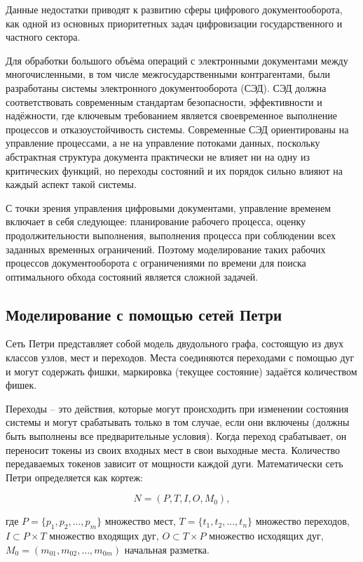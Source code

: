 Данные недостатки приводят к развитию сферы цифрового документооборота\cite{dadaya}, как одной из основных приоритетных задач цифровизации государственного и частного сектора. 

Для обработки большого объёма операций с электронными документами между многочисленными, в том числе межгосударственными контрагентами, были разработаны системы электронного документооборота (СЭД). СЭД должна соответствовать современным стандартам безопасности, эффективности и надёжности\cite{dadaya}, где ключевым требованием является своевременное выполнение процессов и отказоустойчивость системы. Современные СЭД ориентированы на управление процессами, а не на управление потоками данных\cite{dadaya}, поскольку абстрактная структура документа практически не влияет ни на одну из критических функций\cite{dadaya}, но переходы состояний и их порядок сильно влияют на каждый аспект такой системы. 

С точки зрения управления цифровыми документами, управление временем включает в себя следующее: планирование рабочего процесса, оценку продолжительности выполнения, выполнения процесса при соблюдении всех заданных временных ограничений\cite{reward2}. Поэтому моделирование таких рабочих процессов документооборота с ограничениями по времени для поиска оптимального обхода состояний является сложной задачей\cite{dadaya}.

\subsection{Моделирование с помощью сетей Петри}

Сеть Петри представляет собой модель двудольного графа\cite{dadaya}, состоящую из двух классов узлов, мест и переходов. Места соединяются переходами с помощью дуг и могут содержать фишки, маркировка (текущее состояние) задаётся количеством фишек. 

Переходы -- это действия, которые могут происходить при изменении состояния системы и могут срабатывать только в том случае, если они включены (должны быть выполнены все предварительные условия). Когда переход срабатывает, он переносит токены из своих входных мест в свои выходные места. Количество передаваемых токенов зависит от мощности каждой дуги. Математически сеть Петри определяется как кортеж:

\begin{equation}\label{eq:petri}
	N = (P, T, I, O, M_0),
\end{equation}

где $P = \{p_1, p_2, ..., p_m\}$ множество мест, $T = \{t_1, t_2, ..., t_n \}$ множество переходов, $I \subset P \times T$ множество входящих дуг, $O \subset T \times P$ множество исходящих дуг, $M_0 = (m_{01}, m_{02}, …, m_{0m})$ начальная разметка.

